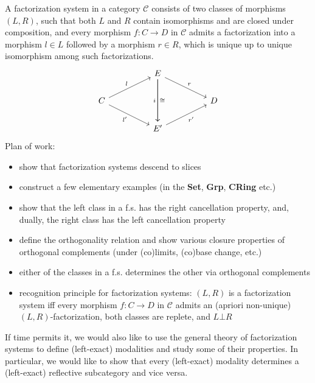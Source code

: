 %

A factorization system in a category $\mathcal{C}$ consists of two classes of morphisms $(L,R)$, such that both $L$ and $R$ contain isomorphisms and are closed under composition, and every morphism $f: C \to D$ in $\mathcal{C}$ admits a factorization into a morphism $l\in L$ followed by a morphism $r\in R$, which is unique up to unique isomorphism among such factorizations.
\[\begin{tikzcd}
	&& E \\
	C &&&& D \\
	&& {E'}
	\arrow["r", from=1-3, to=2-5]
	\arrow["i"', from=1-3, to=3-3]
	\arrow["\cong", from=1-3, to=3-3]
	\arrow["l", from=2-1, to=1-3]
	\arrow["{l'}"', from=2-1, to=3-3]
	\arrow["{r'}"', from=3-3, to=2-5]
\end{tikzcd}\]
Plan of work:
\begin{itemize}
    \item show that factorization systems descend to slices
    \item construct a few elementary examples (in the \textbf{Set}, \textbf{Grp}, \textbf{CRing} etc.)
    \item show that the left class in a f.s. has the right cancellation property, and, dually, the right class has the left cancellation property
    \item define the orthogonality relation and show various closure properties of orthogonal complements (under (co)limits, (co)base change, etc.) 
    \item either of the classes in a f.s. determines the other via orthogonal complements
    \item recognition principle for factorization systems: $(L,R)$ is a factorization system iff every morphism $f: C \to D$ in $\mathcal{C}$ admits an (apriori non-unique) $(L,R)$-factorization, both classes are replete, and $L\bot R$
\end{itemize}
If time permits it, we would also like to use the general theory of factorization systems to define (left-exact) modalities and study some of their properties. In particular, we would like to show that every (left-exact) modality determines a (left-exact) reflective subcategory and vice versa.